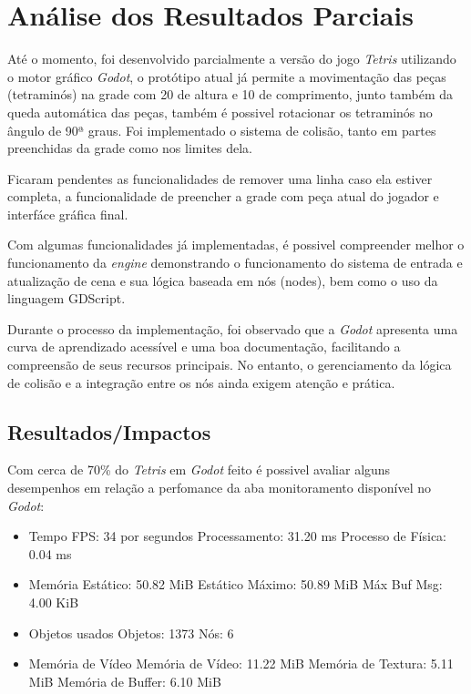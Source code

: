 \chapter{Análise dos Resultados Parciais}
\label{cap:04}

Até o momento, foi desenvolvido parcialmente a versão do jogo \textit{Tetris} utilizando o motor gráfico \textit{Godot},
o protótipo atual já permite a movimentação das peças (tetraminós) na grade com 20 de altura e 10 de comprimento, junto também da 
queda automática das peças, também é possivel rotacionar os tetraminós no ângulo de 90ª graus. Foi implementado o sistema de colisão, 
tanto em partes preenchidas da grade como nos limites dela.

Ficaram pendentes as funcionalidades de remover uma linha caso ela estiver completa, a funcionalidade de preencher
a grade com peça atual do jogador e interfáce gráfica final.

Com algumas funcionalidades já implementadas, é possivel compreender melhor o funcionamento da \textit{engine} 
demonstrando o funcionamento do sistema de entrada e atualização de cena e sua lógica baseada em nós (nodes),
bem como o uso da linguagem GDScript.

Durante o processo da implementação, foi observado que a \textit{Godot} apresenta uma curva de aprendizado acessível e uma boa documentação,
facilitando a compreensão de seus recursos principais. No entanto, o gerenciamento da lógica de colisão e a integração entre os nós ainda exigem atenção e prática.

\section{Resultados/Impactos}


Com cerca de 70\% do \textit{Tetris} em \textit{Godot} feito é possivel avaliar alguns desempenhos em relação a perfomance da aba monitoramento disponível no \textit{Godot}:

\begin{itemize}
	\item Tempo
	\subitem FPS: 34 por segundos
	\subitem Processamento: 31.20 ms
	\subitem Processo de Física: 0.04 ms
	\item Memória
	\subitem Estático: 50.82 MiB
	\subitem Estático Máximo: 50.89 MiB
	\subitem Máx Buf Msg: 4.00 KiB
	\item Objetos usados
	\subitem Objetos: 1373
	\subitem Nós: 6
	\item Memória de Vídeo
	\subitem Memória de Vídeo: 11.22 MiB
	\subitem Memória de Textura: 5.11 MiB
	\subitem Memória de Buffer: 6.10 MiB
\end{itemize}

